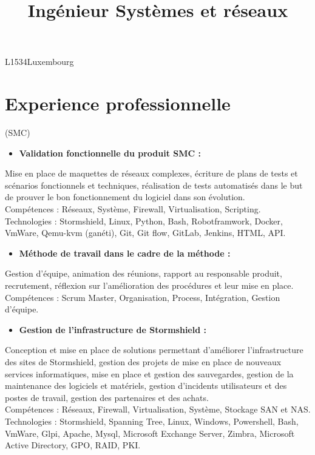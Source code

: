 

\title{Ingénieur Systèmes et réseaux} 
\address{57, rue de la forêt}{L1534}{Luxembourg}


\makecvtitle
\section{Experience professionnelle}
	 {(SMC)}
		{
			\begin{itemize}
				\item \textbf{Validation fonctionnelle du produit SMC :}
			\end{itemize}
			Mise en place de maquettes de réseaux complexes, écriture de plans de tests et scénarios fonctionnels et techniques, réalisation de tests automatisés dans le but de prouver le bon fonctionnement du logiciel dans son évolution.\\
			\textcolor{myblue}{Compétences : Réseaux, Système, Firewall, Virtualisation, Scripting.}\\
            \textcolor{myblue}{Technologies : Stormshield, Linux, Python, Bash, Robotframwork, Docker, VmWare, Qemu-kvm (ganéti), Git, Git flow, GitLab, Jenkins, HTML, API.}
			\begin{itemize}
				\item \textbf{Méthode de travail dans le cadre de la méthode :}
			\end{itemize}
			Gestion d'équipe, animation des réunions, rapport au responsable produit, recrutement, réflexion sur l'amélioration des procédures et leur mise en place.\\
			\textcolor{myblue}{Compétences : Scrum Master, Organisation, Process, Intégration, Gestion d'équipe.}\\
		}
	    {
		    \begin{itemize}
				\item \textbf{Gestion de l'infrastructure de Stormshield :}
			\end{itemize}
			Conception et mise en place de solutions permettant d'améliorer l'infrastructure des sites de Stormshield, gestion des projets de mise en place de nouveaux services informatiques, mise en place et gestion des sauvegardes, gestion de la maintenance des logiciels et matériels, gestion d'incidents utilisateurs et des postes de travail, gestion des partenaires et des achats.\\
			\textcolor{myblue}{Compétences : Réseaux, Firewall, Virtualisation, Système, Stockage SAN et NAS.}\\
			\textcolor{myblue}{Technologies : Stormshield, Spanning Tree, Linux, Windows, Powershell, Bash, VmWare, Glpi, Apache, Mysql, Microsoft Exchange Server, Zimbra, Microsoft Active Directory, GPO, RAID, PKI.}\\
		} 	
